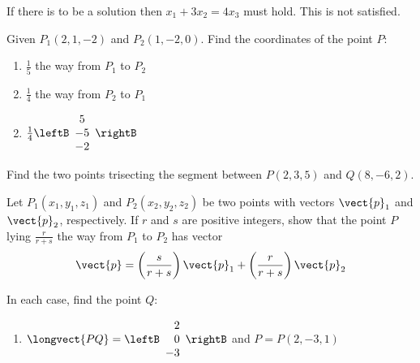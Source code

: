 \begin{multicols}{2}
\begin{ex}
\begin{sol}
\begin{enumerate}[label={\alph*.}]
If there is to be a solution then $x_{1} + 3x_{2} = 4x_{3}$ must hold. This is not satisfied.
\end{enumerate}
\end{sol}
\end{ex}

\begin{ex}
Given $P_{1}(2, 1, -2)$ and $P_{2}(1, -2, 0)$. Find the coordinates of the point $P$:
\begin{enumerate}[label={\alph*.}]
\item $\frac{1}{5}$ the way from $P_{1}$ to $P_{2}$

\item $\frac{1}{4}$ the way from $P_{2}$ to $P_{1}$

\end{enumerate}
\begin{sol}
\begin{enumerate}[label={\alph*.}]
\setcounter{enumi}{1}
\item  
$\frac{1}{4}\leftB
\begin{array}{c}
5\\
-5\\
-2
\end{array}
\rightB
$

\end{enumerate}
\end{sol}
\end{ex}

\begin{ex}
Find the two points trisecting the segment between $P(2, 3, 5)$ and $Q(8, -6, 2)$.
\end{ex}

\begin{ex}
Let $P_{1}(x_{1}, y_{1}, z_{1})$ and $P_{2}(x_{2}, y_{2}, z_{2})$ be two points with vectors $\vect{p}_{1}$ and $\vect{p}_{2}$, respectively. If $r$ and $s$ are positive integers, show that the point $P$ lying $\frac{r}{r + s}$ the way from $P_{1}$ to $P_{2}$ has vector
\begin{equation*}
\vect{p} = \left( \frac{s}{r + s} \right)\vect{p}_{1} + \left( \frac{r}{r + s} \right)\vect{p}_{2}
\end{equation*}
\end{ex}

\begin{ex}
In each case, find the point $Q$:


\begin{enumerate}[label={\alph*.}]
\item
$\longvect{PQ} = \leftB
\begin{array}{r}
2\\
0\\
-3
\end{array}
\rightB$
and $P = P(2,-3,1)
$



\end{enumerate}
\end{ex}
\end{multicols}
